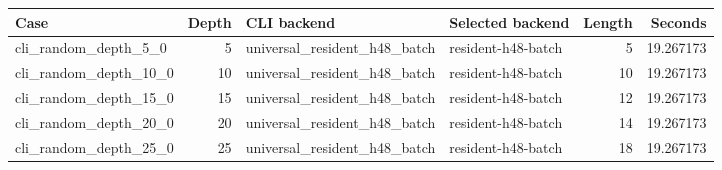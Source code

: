 {\small
\begin{tabular}{lrllrr}
\hline
Case & Depth & CLI backend & Selected backend & Length & Seconds \\
\hline
cli\_random\_depth\_5\_0 & 5 & universal\_resident\_h48\_batch & resident-h48-batch & 5 & 19.267173 \\
cli\_random\_depth\_10\_0 & 10 & universal\_resident\_h48\_batch & resident-h48-batch & 10 & 19.267173 \\
cli\_random\_depth\_15\_0 & 15 & universal\_resident\_h48\_batch & resident-h48-batch & 12 & 19.267173 \\
cli\_random\_depth\_20\_0 & 20 & universal\_resident\_h48\_batch & resident-h48-batch & 14 & 19.267173 \\
cli\_random\_depth\_25\_0 & 25 & universal\_resident\_h48\_batch & resident-h48-batch & 18 & 19.267173 \\
\hline
\end{tabular}
}
